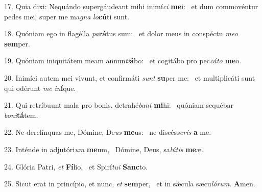 17. Quia dixi: Nequándo supergáudeant mihi inimí\textit{ci} \textbf{me}i: \ast\  et dum commovéntur pedes mei, super me ma\textit{gna} \textit{lo}\textbf{cú}ti sunt.\

18. Quóniam ego in flagélla \textit{pa}\textbf{rá}tus sum: \ast\  et dolor meus in conspéctu \textit{me}\textit{o} \textbf{sem}per.\

19. Quóniam iniquitátem meam annun\textit{ti}\textbf{á}bo: \ast\  et cogitábo pro pec\textit{cá}\textit{to} \textbf{me}o.\

20. Inimíci autem mei vivunt, et confirmáti \textit{sunt} \textbf{su}per me: \ast\  et multiplicáti sunt qui odérunt \textit{me} \textit{in}\textbf{í}que.\

21. Qui retríbuunt mala pro bonis, detrahé\textit{bant} \textbf{mi}hi: \ast\  quóniam sequébar \textit{bo}\textit{ni}\textbf{tá}tem.\

22. Ne derelínquas me, Dómine, De\textit{us} \textbf{me}us: \ast\  ne discés\textit{se}\textit{ris} \textbf{a} me.\

23. Inténde in adjutóri\textit{um} \textbf{me}um, \ast\  Dómine, Deus, sa\textit{lú}\textit{tis} \textbf{me}æ.\

24. Glória Patri, \textit{et} \textbf{Fí}lio, \ast\  et Spirí\textit{tu}\textit{i} \textbf{Sanc}to.\

25. Sicut erat in princípio, et nunc, \textit{et} \textbf{sem}per, \ast\  et in sǽcula sæcu\textit{ló}\textit{rum}. \textbf{A}men.\

